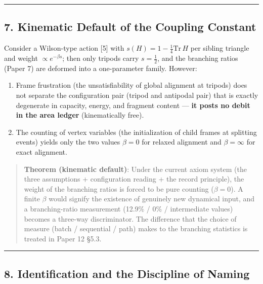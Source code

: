 \documentclass[
]{article}
\providecommand{\tightlist}{%
  \setlength{\itemsep}{0pt}\setlength{\parskip}{0pt}}
\begin{document}
\begin{center}\rule{0.5\linewidth}{0.5pt}\end{center}

\subsection{7. Kinematic Default of the Coupling
Constant}\label{kinematic-default-of-the-coupling-constant}

Consider a Wilson-type action {[}5{]} with
\(s(H)=1-\tfrac14\mathrm{Tr}\,H\) per sibling triangle and weight
\(\propto e^{-\beta s}\); then only tripods carry \(s=\tfrac12\), and
the branching ratios (Paper 7) are deformed into a one-parameter family.
However:

\begin{enumerate}
\def\labelenumi{\arabic{enumi}.}
\tightlist
\item
  Frame frustration (the unsatisfiability of global alignment at
  tripods) does not separate the configuration pair (tripod and
  antipodal pair) that is exactly degenerate in capacity, energy, and
  fragment content --- \textbf{it posts no debit in the area ledger}
  (kinematically free).
\item
  The counting of vertex variables (the initialization of child frames
  at splitting events) yields only the two values \(\beta=0\) for
  relaxed alignment and \(\beta=\infty\) for exact alignment.
\end{enumerate}

\begin{quote}
\textbf{Theorem (kinematic default)}: Under the current axiom system
(the three assumptions + configuration reading + the record principle),
the weight of the branching ratios is forced to be pure counting
(\(\beta=0\)). A finite \(\beta\) would signify the existence of
genuinely new dynamical input, and a branching-ratio measurement (12.9\%
/ 0\% / intermediate values) becomes a three-way discriminator. The
difference that the choice of measure (batch / sequential / path) makes
to the branching statistics is treated in Paper 12 §5.3.
\end{quote}

\begin{center}\rule{0.5\linewidth}{0.5pt}\end{center}

\subsection{8. Identification and the Discipline of
Naming}\label{identification-and-the-discipline-of-naming}
\end{document}
